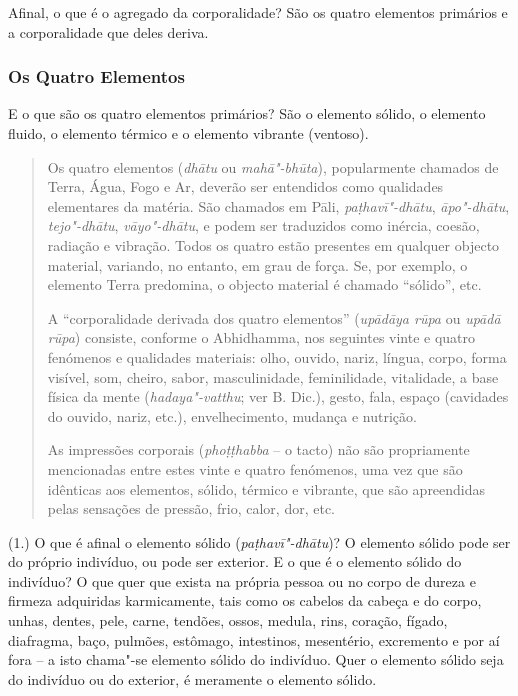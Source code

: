 
Afinal, o que é o agregado da corporalidade? São os quatro elementos primários e
a corporalidade que deles deriva.

\subsubsection{Os Quatro Elementos}

E o que são os quatro elementos primários? São o elemento sólido, o elemento
fluido, o elemento térmico e o elemento vibrante (ventoso).


\begin{quote}
  Os quatro elementos (\emph{dhātu} ou \emph{mahā"-bhūta}), popularmente chamados
  de Terra, Água, Fogo e Ar, deverão ser entendidos como qualidades elementares
  da matéria. São chamados em Pāli, \emph{pa\d{t}havī"-dhātu}, \emph{āpo"-dhātu},
  \emph{tejo"-dhātu}, \emph{vāyo"-dhātu}, e podem ser traduzidos como inércia,
  coesão, radiação e vibração. Todos os quatro estão presentes em qualquer
  objecto material, variando, no entanto, em grau de força. Se, por exemplo, o
  elemento Terra predomina, o objecto material é chamado “sólido”, etc.

  A “corporalidade derivada dos quatro elementos” (\emph{upādāya rūpa} ou
  \emph{upādā rūpa}) consiste, conforme o Abhidhamma, nos seguintes vinte e
  quatro fenómenos e qualidades materiais: olho, ouvido, nariz, língua, corpo,
  forma visível, som, cheiro, sabor, masculinidade, feminilidade, vitalidade, a
  base física da mente (\emph{hadaya"-vatthu}; ver B. Dic.), gesto, fala, espaço
  (cavidades do ouvido, nariz, etc.), envelhecimento, mudança e nutrição.

  As impressões corporais (\emph{pho\d{t}\d{t}habba} -- o tacto) não são propriamente
  mencionadas entre estes vinte e quatro fenómenos, uma vez que são idênticas
  aos elementos, sólido, térmico e vibrante, que são apreendidas pelas sensações
  de pressão, frio, calor, dor, etc.
\end{quote}

(1.) O que é afinal o elemento sólido (\emph{paṭhavī"-dhātu})? O elemento sólido
pode ser do próprio indivíduo, ou pode ser exterior. E o que é o elemento sólido
do indivíduo? O que quer que exista na própria pessoa ou no corpo de dureza e
firmeza adquiridas karmicamente, tais como os cabelos da cabeça e do corpo,
unhas, dentes, pele, carne, tendões, ossos, medula, rins, coração, fígado,
diafragma, baço, pulmões, estômago, intestinos, mesentério, excremento e por aí
fora -- a isto chama"-se elemento sólido do indivíduo. Quer o elemento sólido
seja do indivíduo ou do exterior, é meramente o elemento sólido.

